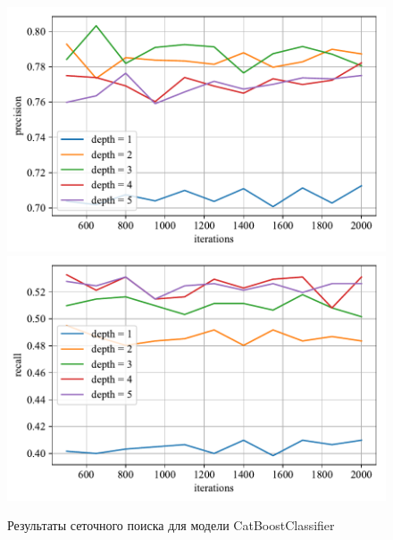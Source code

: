 \begin{figure}
    \centering
    \includegraphics{./images/toloka_catboost_precision.pdf}
    \includegraphics{./images/toloka_catboost_recall.pdf}
    \caption{Результаты сеточного поиска для модели CatBoostClassifier}
    \label{fig:toloka_catboost}
\end{figure}
